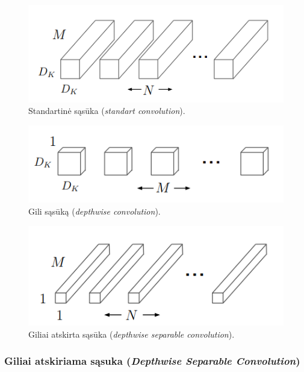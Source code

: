 \documentclass{VUMIFInfKursinis}
\begin{document}
\begin{figure}[h!]
\centering
  \includegraphics[scale=0.7]{img/standart_convolution.PNG}
  \caption{Standartinė sąsūka (\textit{standart convolution}).}
  \label{fig:standart_convolution}
\end{figure}

\begin{figure}[h!]
\centering
  \includegraphics[scale=0.7]{img/depthwise_convolution.PNG}
  \caption{Gili sąsūką (\textit{depthwise convolution}).}
  \label{fig:depthwise_convolution}
\end{figure}

\begin{figure}[h!]
\centering
  \includegraphics[scale=0.7]{img/pointwise_convolution.PNG}
  \caption{Giliai atskirta sąsūka (\textit{depthwise separable convolution}).}
  \label{fig:pointwise_convolution}
\end{figure}

\newpage

\subsubsection{Giliai atskiriama sąsuka (\textit{Depthwise Separable Convolution})}
\end{document}
